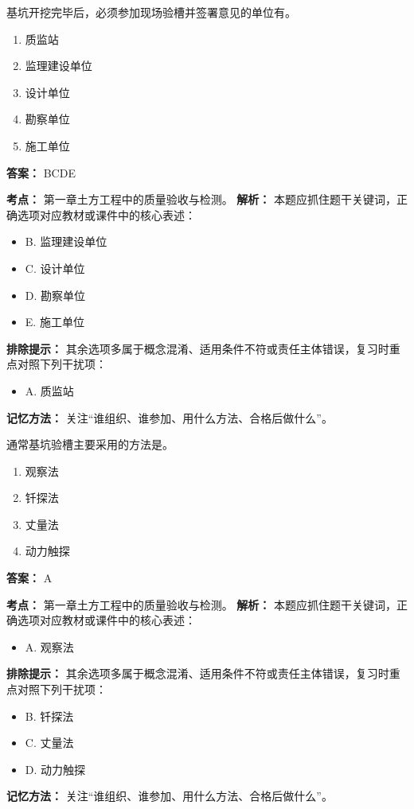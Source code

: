 \documentclass[UTF8,fontset=fandol,11pt]{ctexart}
\begin{document}
\begin{quizbox}[title={第 25 题}]
基坑开挖完毕后，必须参加现场验槽并签署意见的单位有。\\
\begin{enumerate}[label=\Alph*.]
\item 质监站
\item 监理建设单位
\item 设计单位
\item 勘察单位
\item 施工单位
\end{enumerate}
\textbf{答案：} BCDE
\vspace{0.25em}
\begin{answerbox}[title={考点解析}]
\textbf{考点：} 第一章土方工程中的质量验收与检测。
\textbf{解析：} 本题应抓住题干关键词，正确选项对应教材或课件中的核心表述：
\begin{itemize}
\item B. 监理建设单位
\item C. 设计单位
\item D. 勘察单位
\item E. 施工单位
\end{itemize}
\textbf{排除提示：} 其余选项多属于概念混淆、适用条件不符或责任主体错误，复习时重点对照下列干扰项：
\begin{itemize}
\item A. 质监站
\end{itemize}
\textbf{记忆方法：} 关注“谁组织、谁参加、用什么方法、合格后做什么”。
\end{answerbox}
\end{quizbox}

\begin{quizbox}[title={第 26 题}]
通常基坑验槽主要采用的方法是。\\
\begin{enumerate}[label=\Alph*.]
\item 观察法
\item 钎探法
\item 丈量法
\item 动力触探
\end{enumerate}
\textbf{答案：} A
\vspace{0.25em}
\begin{answerbox}[title={考点解析}]
\textbf{考点：} 第一章土方工程中的质量验收与检测。
\textbf{解析：} 本题应抓住题干关键词，正确选项对应教材或课件中的核心表述：
\begin{itemize}
\item A. 观察法
\end{itemize}
\textbf{排除提示：} 其余选项多属于概念混淆、适用条件不符或责任主体错误，复习时重点对照下列干扰项：
\begin{itemize}
\item B. 钎探法
\item C. 丈量法
\item D. 动力触探
\end{itemize}
\textbf{记忆方法：} 关注“谁组织、谁参加、用什么方法、合格后做什么”。
\end{answerbox}
\end{quizbox}
\end{document}
